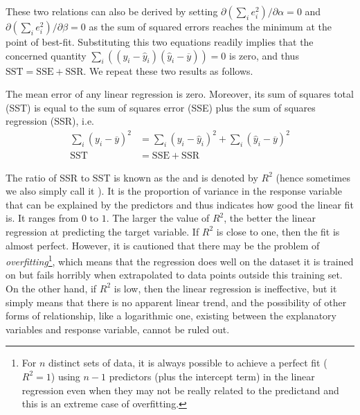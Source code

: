 These two relations can also be derived by setting $\partial (\sum_i e_i^2)/\partial \alpha = 0$ and $\partial (\sum_i e_i^2)/\partial \beta = 0$ as the sum of squared errors reaches the minimum at the point of best-fit. Substituting this two equations readily implies that the concerned quantity $\sum_i ((y_i - \hat{y}_i) (\hat{y}_i - \overline{y})) = 0$ is zero, and thus $\text{SST} = \text{SSE} + \text{SSR}$. We repeat these two results as follows.
\begin{proper}
The mean error of any linear regression is zero. Moreover, its sum of squares total (SST) is equal to the sum of squares error (SSE) plus the sum of squares regression (SSR), i.e.\ 
\begin{subequations}
\begin{align}
\sum_i (y_i - \overline{y})^2 &= \sum_i (y_i - \hat{y}_i)^2 + \sum_i (\hat{y}_i - \overline{y})^2 \\
\text{SST} &= \text{SSE} + \text{SSR}   
\end{align}    
\end{subequations}
\end{proper}
The ratio of SSR to SST is known as the  and is denoted by $R^2$ (hence sometimes we also simply call it ). It is the proportion of variance in the response variable that can be explained by the predictors and thus indicates how good the linear fit is. It ranges from $0$ to $1$. The larger the value of $R^2$, the better the linear regression at predicting the target variable. If $R^2$ is close to one, then the fit is almost perfect. However, it is cautioned that there may be the problem of \textit{overfitting}\footnote{For $n$ distinct sets of data, it is always possible to achieve a perfect fit ($R^2 = 1$) using $n-1$ predictors (plus the intercept term) in the linear regression even when they may not be really related to the predictand and this is an extreme case of overfitting.}, which means that the regression does well on the dataset it is trained on but fails horribly when extrapolated to data points outside this training set. On the other hand, if $R^2$ is low, then the linear regression is ineffective, but it simply means that there is no apparent linear trend, and the possibility of other forms of relationship, like a logarithmic one, existing between the explanatory variables and response variable, cannot be ruled out.

